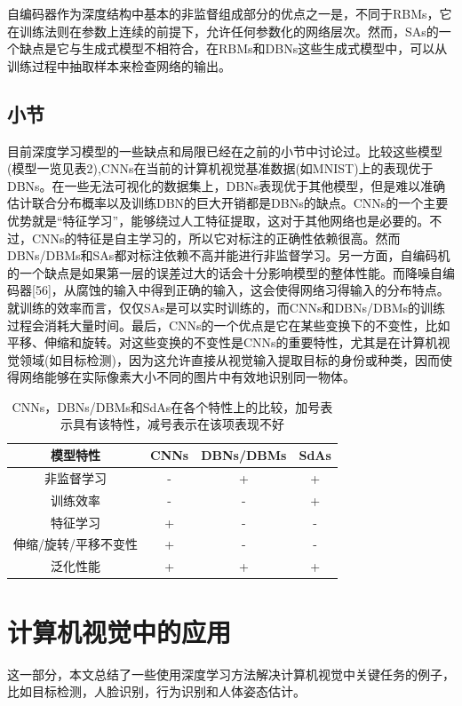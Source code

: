 \documentclass[a4paper]{article}
\begin{document}
自编码器作为深度结构中基本的非监督组成部分的优点之一是，不同于RBMs，它在训练法则在参数上连续的前提下，允许任何参数化的网络层次。然而，SAs的一个缺点是它与生成式模型不相符合，在RBMs和DBNs这些生成式模型中，可以从训练过程中抽取样本来检查网络的输出。
\subsection{小节}
目前深度学习模型的一些缺点和局限已经在之前的小节中讨论过。比较这些模型(模型一览见表2),CNNs在当前的计算机视觉基准数据(如MNIST)上的表现优于DBNs。在一些无法可视化的数据集上，DBNs表现优于其他模型，但是难以准确估计联合分布概率以及训练DBN的巨大开销都是DBNs的缺点。CNNs的一个主要优势就是“特征学习”，能够绕过人工特征提取，这对于其他网络也是必要的。不过，CNNs的特征是自主学习的，所以它对标注的正确性依赖很高。然而DBNs/DBMs和SAs都对标注依赖不高并能进行非监督学习。另一方面，自编码机的一个缺点是如果第一层的误差过大的话会十分影响模型的整体性能。而降噪自编码器[56]，从腐蚀的输入中得到正确的输入，这会使得网络习得输入的分布特点。就训练的效率而言，仅仅SAs是可以实时训练的，而CNNs和DBNs/DBMs的训练过程会消耗大量时间。最后，CNNs的一个优点是它在某些变换下的不变性，比如平移、伸缩和旋转。对这些变换的不变性是CNNs的重要特性，尤其是在计算机视觉领域(如目标检测)，因为这允许直接从视觉输入提取目标的身份或种类，因而使得网络能够在实际像素大小不同的图片中有效地识别同一物体。
\begin{table}
	\centering
	\caption{CNNs，DBNs/DBMs和SdAs在各个特性上的比较，加号表示具有该特性，减号表示在该项表现不好}
	\begin{tabular}{cccc}
		\toprule  %
		模型特性             & CNNs & DBNs/DBMs & SdAs \\
		\midrule  %
		非监督学习           & -    & +         & +    \\
		训练效率             & -    & -         & +    \\
		特征学习             & +    & -         & -    \\
		伸缩/旋转/平移不变性 & +    & -         & -    \\
		泛化性能             & +    & +         & +    \\
		\bottomrule %
	\end{tabular}
\end{table}
\section{计算机视觉中的应用}
这一部分，本文总结了一些使用深度学习方法解决计算机视觉中关键任务的例子，比如目标检测，人脸识别，行为识别和人体姿态估计。
\end{document}
